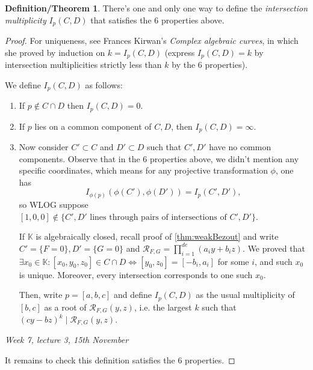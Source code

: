 \documentclass{article}
\newcommand{\K}{\mathbb{K}}
\newcommand{\re}{\mathcal{R}}
\theoremstyle{definition}
\newtheorem{defnthm}[defn]{Definition/Theorem}
\begin{document}
\begin{defnthm}
There's one and only one way to define the \textit{intersection multiplicity} $I_p(C,D)$ that satisfies the 6 properties above.
\end{defnthm}
\begin{proof}
For uniqueness, see Frances Kirwan's \textit{Complex algebraic curves}, in which she proved by induction on $k=I_p(C,D)$ (express $I_p(C,D)=k$ by intersection multiplicities strictly less than $k$ by the 6 properties).

We define $I_p(C,D)$ as follows:
\begin{enumerate}
\item If $p\notin C\cap D$ then $I_p(C,D)=0$.
\item If $p$ lies on a common component of $C,D$, then $I_p(C,D)=\infty$.

\item Now consider $C'\subset C$ and $D'\subset D$ such that $C',D'$ have no common components. Observe that in the 6 properties above, we didn't mention any specific coordinates, which means for any projective transformation $\phi$, one has
\[
I_{\phi(p)}(\phi(C'),\phi(D'))=I_p(C',D'),
\]
so WLOG suppose $[1,0,0]\notin\{C',D'\text{ lines through pairs of intersections of }C',D'\}$.

If $\K$ is algebraically closed, recall proof of \ref{thm:weakBezout} and write $C'=\{F=0\},D'=\{G=0\}$ and $\re_{F,G}=\prod_{i=1}^{de}(a_iy+b_iz)$. We proved that $\exists x_0\in\K:[x_0,y_0,z_0]\in C\cap D\iff [y_0,z_0]=[-b_i,a_i]$ for some $i$, and such $x_0$ is unique. Moreover, every intersection corresponds to one such $x_0$.

Then, write $p=[a,b,c]$ and define $I_p(C,D)$ as the usual multiplicity of $[b,c]$ as a root of $\re_{F,G}(y,z)$, i.e. the largest $k$ such that $(cy-bz)^k\mid\re_{F,G}(y,z)$.
\end{enumerate}

\begin{flushright}
\textit{Week 7, lecture 3, 15th November}
\end{flushright}

It remains to check this definition satisfies the 6 properties.


\end{proof}
\end{document}
